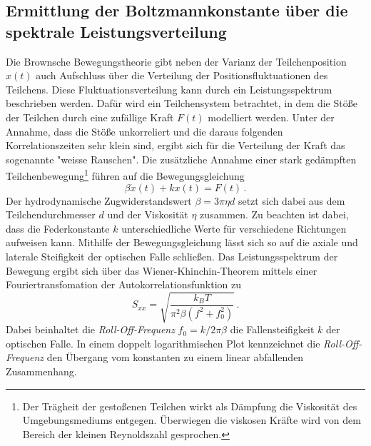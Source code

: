 \subsection{Ermittlung der Boltzmannkonstante über die spektrale Leistungsverteilung}
Die Brownsche Bewegungstheorie gibt neben der Varianz der Teilchenposition $x(t)$ auch Aufschluss über die Verteilung der Positionsfluktuationen des Teilchens. Diese Fluktuationsverteilung kann durch ein Leistungsspektrum beschrieben werden. Dafür wird ein Teilchensystem betrachtet, in dem die Stöße der Teilchen durch eine zufällige Kraft $F(t)$ modelliert werden.
Unter der Annahme, dass die Stöße unkorreliert und die daraus folgenden Korrelationszeiten sehr klein sind, ergibt sich für die Verteilung der Kraft das sogenannte "weisse Rauschen". Die zusätzliche Annahme einer stark gedämpften Teilchenbewegung\footnote{Der Trägheit der gestoßenen Teilchen wirkt als Dämpfung die Viskosität des Umgebungsmediums entgegen. Überwiegen die viskosen Kräfte wird von dem Bereich der kleinen Reynoldszahl gesprochen.} führen auf die Bewegungsgleichung
\begin{equation}
  \beta \dot x(t) + kx(t) = F(t)\, .
\end{equation}
Der hydrodynamische Zugwiderstandswert $\beta = 3\pi\eta d $ setzt sich dabei aus dem Teilchendurchmesser $d$ und der Viskosität $\eta$ zusammen. Zu beachten ist dabei, dass die Federkonstante $k$ unterschiedliche Werte für verschiedene Richtungen aufweisen kann. Mithilfe der Bewegungsgleichung lässt sich so auf die axiale und laterale Steifigkeit der optischen Falle schließen.
Das Leistungsspektrum der Bewegung ergibt sich über das Wiener-Khinchin-Theorem mittels einer Fouriertransfomation der Autokorrelationsfunktion zu
\begin{equation}
  S_{xx} = \sqrt{\frac{k_B T}{\pi^2\beta ( f^2 + f_0^2)}}\, .
\end{equation}
Dabei beinhaltet die \textit{Roll-Off-Frequenz} $f_0 = k / 2\pi\beta$ die Fallensteifigkeit $k$ der optischen Falle. \cite{MIT}\cite{Brown} In einem doppelt logarithmischen Plot kennzeichnet die \textit{Roll-Off-Frequenz} den Übergang vom konstanten zu einem linear abfallenden Zusammenhang. \\

